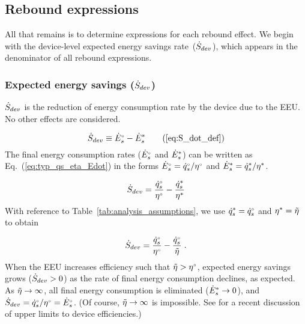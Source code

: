 












\subsection{Rebound expressions}
\label{sec:rebound_expressions}

All that remains is to determine expressions for each rebound effect.
We begin with the device-level expected energy savings rate~($\dot{S}_{dev}$), which
appears in the denominator of all rebound expressions.


\subsubsection{Expected energy savings ($\dot{S}_{dev}$)} 
\label{sec:Sdot}

$\dot{S}_{dev}$ is the reduction of energy consumption rate
by the device due to the EEU.
No other effects are considered.

\begin{equation}
  \Sdot \equiv \rbempl{E}_s - \raempl{E}_s  \tag{\ref{eq:S_dot_def}}
\end{equation}
%
The final energy consumption rates (${}{\dot{E}}^{\scriptscriptstyle \circ}_s$ and ${\dot{E}}^*_s$) 
can be written as Eq.~(\ref{eq:typ_qs_eta_Edot}) in the forms
${}{\dot{E}}^{\scriptscriptstyle \circ}_s = {}{\dot{q}}^{\scriptscriptstyle \circ}_s/{}{\eta}^{\scriptscriptstyle \circ}$ and 
${\dot{E}}^*_s = {\dot{q}}^*_s/{\eta}^*$. 

\begin{equation}
  \dot{S}_{dev} = \frac{{}{\dot{q}}^{\scriptscriptstyle \circ}_s}{{}{\eta}^{\scriptscriptstyle \circ}} - \frac{{\dot{q}}^*_s}{{\eta}^*}
\end{equation}
%
With reference to Table~\ref{tab:analysis_assumptions}, 
we use ${\dot{q}}^*_s = {}{\dot{q}}^{\scriptscriptstyle \circ}_s$ and ${\eta}^* = \tilde{\eta}$ to obtain

\begin{equation}
  \dot{S}_{dev} = \frac{{}{\dot{q}}^{\scriptscriptstyle \circ}_s}{{}{\eta}^{\scriptscriptstyle \circ}} - \frac{{}{\dot{q}}^{\scriptscriptstyle \circ}_s}{\tilde{\eta}} \; .
\end{equation}
%
When the EEU increases efficiency such that $\tilde{\eta} > {}{\eta}^{\scriptscriptstyle \circ}$,
expected energy savings grows ($\dot{S}_{dev} > 0$)
as the rate of final energy consumption declines,
as expected.
As $\tilde{\eta} \rightarrow \infty$,
all final energy consumption is eliminated (${\dot{E}}^*_s \rightarrow 0$), and
$\dot{S}_{dev} = {}{\dot{q}}^{\scriptscriptstyle \circ}_s/{}{\eta}^{\scriptscriptstyle \circ} = {}{\dot{E}}^{\scriptscriptstyle \circ}_s$.
(Of course, $\tilde{\eta} \rightarrow \infty$ is impossible. 
See \citet{Paoli:2020aa} for a recent discussion of upper limits to device efficiencies.)

